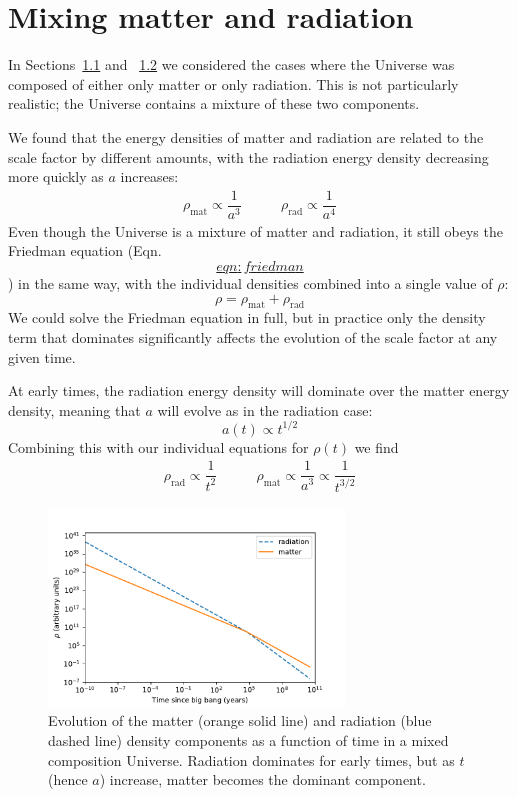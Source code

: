 \documentclass[]{book}
\begin{document}
\hypertarget{sec:mixtures}{%
\section{Mixing matter and radiation}\label{sec:mixtures}}

In Sections~\protect\hyperlink{sec:matter_eos}{1.1} and
~\protect\hyperlink{sec:radiation_eos}{1.2} we considered the cases where the
Universe was composed of either only matter or only radiation. This is
not particularly realistic; the Universe contains a mixture of these two
components.

We found that the energy densities of matter and radiation are related
to the scale factor by different amounts, with the radiation energy
density decreasing more quickly as \(a\) increases: \[\begin{array}{lr}
    \rho_{\text{mat}} \propto \dfrac{1}{a^3} &\qquad
    \rho_{\text{rad}} \propto \dfrac{1}{a^4}
\end{array}\] Even though the Universe is a mixture of matter and
radiation, it still obeys the Friedman equation
(Eqn.~\protect\hyperlink{eqn:friedman}{\[eqn:friedman\]}) in the same way, with the individual
densities combined into a single value of \(\rho\):
\[\rho = \rho_{\text{mat}} + \rho_{\text{rad}}\] We could solve the
Friedman equation in full, but in practice only the density term that
dominates significantly affects the evolution of the scale factor at any
given time.

At early times, the radiation energy density will dominate over the
matter energy density, meaning that \(a\) will evolve as in the radiation
case: \[a(t) \propto t^{1/2}\] Combining this with our individual
equations for \(\rho(t)\) we find \[\begin{array}{lr}
\rho_{\text{rad}} \propto \dfrac{1}{t^2} & \qquad
    \rho_{\text{mat}} \propto \dfrac{1}{a^3} \propto \dfrac{1}{t^{3/2}}
\end{array}\]

\begin{figure}
\centering
\includegraphics[width=0.7\textwidth,height=\textheight]{Images/density_plot.pdf}
\caption{Evolution of the matter (orange solid line) and radiation (blue dashed
line) density components as a function of time in a mixed composition
Universe. Radiation dominates for early times, but as \(t\) (hence \(a\))
increase, matter becomes the dominant
component.}
\end{figure}
\end{document}
